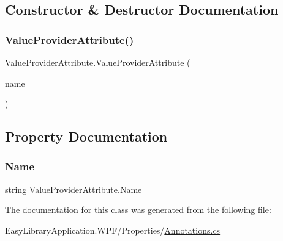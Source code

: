 \subsection{Constructor \& Destructor Documentation}
\mbox{\label{class_value_provider_attribute_a767d9340784b59123bd39c4e43b7a08c}} 
\subsubsection{\texorpdfstring{Value\+Provider\+Attribute()}{ValueProviderAttribute()}}
{\footnotesize\ttfamily Value\+Provider\+Attribute.\+Value\+Provider\+Attribute (\begin{DoxyParamCaption}\item[{\mbox{[}\+Not\+Null\mbox{]} string}]{name }\end{DoxyParamCaption})}



\subsection{Property Documentation}
\mbox{\label{class_value_provider_attribute_a954d0ecb3682e337a4c174d238bdd892}} 
\subsubsection{\texorpdfstring{Name}{Name}}
{\footnotesize\ttfamily string Value\+Provider\+Attribute.\+Name\hspace{0.3cm}{\ttfamily [get]}}



The documentation for this class was generated from the following file\+:\begin{DoxyCompactItemize}
\item 
Easy\+Library\+Application.\+W\+P\+F/\+Properties/\mbox{\hyperlink{_annotations_8cs}{Annotations.\+cs}}\end{DoxyCompactItemize}
